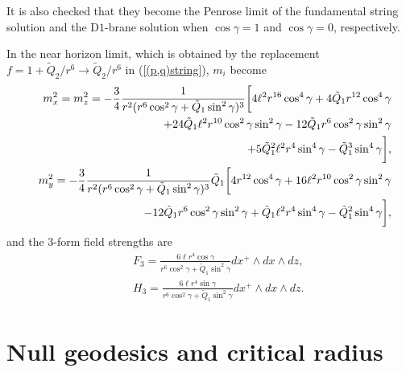 \documentclass[a4paper,12pt]{article}
\begin{document}
It is also checked that they become the Penrose limit of 
the fundamental string solution and the D$1$-brane solution 
when $\cos\gamma=1$ and $\cos\gamma=0$, respectively.



In the near horizon limit, which is obtained by
the replacement $f=1+\tilde{Q}_{2}/r^{6} \rightarrow
\tilde{Q}_{2}/r^6$ in (\ref{(p,q)string}), $m_i$ become
\begin{eqnarray}
&& m_{x}^2= m_{z}^2=
-{3\over4} {1
\over
r^2 (r^6\cos^2\gamma +\tilde{Q}_{1}\sin^2\gamma)^3 }
\biggl[4\ell^2r^{16}\cos^4\gamma
+4\tilde{Q}_{1} r^{12}\cos^4\gamma
\nonumber\\
&&\quad\quad\quad\quad\quad\quad
+24\tilde{Q}_{1}\ell^2r^{10}\cos^2\gamma\sin^2\gamma
-12\tilde{Q}_{1} r^6 \cos^2\gamma\sin^2\gamma
\nonumber \\
&&\quad\quad\quad\quad\quad\quad
+5\tilde{Q}_{1}^{2}\ell^2 r^4\sin^4\gamma 
-\tilde{Q}_{1}^{3}\sin^4\gamma
\biggr], \nonumber\\
&&m_{y}^2=
-{3\over4} {1
\over
r^2 (r^6\cos^2\gamma +\tilde{Q}_{1}\sin^2\gamma)^3 }
\tilde{Q}_{1}\biggl[
4r^{12}\cos^4\gamma+16\ell^2r^{10}\cos^2\gamma\sin^2\gamma
\nonumber\\
&&\quad\quad\quad
-12\tilde{Q}_{1}r^6 \cos^2\gamma\sin^2\gamma
+\tilde{Q}_1\ell^2r^4\sin^4\gamma-\tilde{Q}_{1}^2\sin^4\gamma
\biggr],
\end{eqnarray}
and  the $3$-form field strengths are
\begin{eqnarray}
&&F_3=
\frac{6\ell r^4 \cos\gamma}{r^6\cos^2\gamma +\tilde{Q}_1\sin^2\gamma}
dx^+\wedge dx\wedge dz,
\nonumber \\
&&H_3=
\frac{6\ell r^4 \sin\gamma}{r^6\cos^2\gamma +\tilde{Q}_1\sin^2\gamma}
dx^+\wedge dx\wedge dz.
\label{NHLpq1}
\end{eqnarray}

\section{Null geodesics and critical radius}



\end{document}
